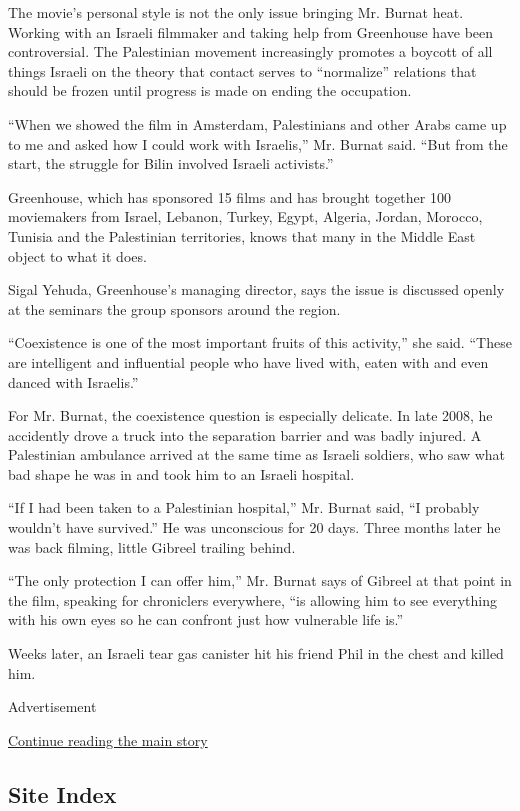 The movie's personal style is not the only issue bringing Mr. Burnat
heat. Working with an Israeli filmmaker and taking help from Greenhouse
have been controversial. The Palestinian movement increasingly promotes
a boycott of all things Israeli on the theory that contact serves to
``normalize'' relations that should be frozen until progress is made on
ending the occupation.

``When we showed the film in Amsterdam, Palestinians and other Arabs
came up to me and asked how I could work with Israelis,'' Mr. Burnat
said. ``But from the start, the struggle for Bilin involved Israeli
activists.''

Greenhouse, which has sponsored 15 films and has brought together 100
moviemakers from Israel, Lebanon, Turkey, Egypt, Algeria, Jordan,
Morocco, Tunisia and the Palestinian territories, knows that many in the
Middle East object to what it does.

Sigal Yehuda, Greenhouse's managing director, says the issue is
discussed openly at the seminars the group sponsors around the region.

``Coexistence is one of the most important fruits of this activity,''
she said. ``These are intelligent and influential people who have lived
with, eaten with and even danced with Israelis.''

For Mr. Burnat, the coexistence question is especially delicate. In late
2008, he accidently drove a truck into the separation barrier and was
badly injured. A Palestinian ambulance arrived at the same time as
Israeli soldiers, who saw what bad shape he was in and took him to an
Israeli hospital.

``If I had been taken to a Palestinian hospital,'' Mr. Burnat said, ``I
probably wouldn't have survived.'' He was unconscious for 20 days. Three
months later he was back filming, little Gibreel trailing behind.

``The only protection I can offer him,'' Mr. Burnat says of Gibreel at
that point in the film, speaking for chroniclers everywhere, ``is
allowing him to see everything with his own eyes so he can confront just
how vulnerable life is.''

Weeks later, an Israeli tear gas canister hit his friend Phil in the
chest and killed him.

Advertisement

\protect\hyperlink{after-bottom}{Continue reading the main story}

\hypertarget{site-index}{%
\subsection{Site Index}\label{site-index}}


